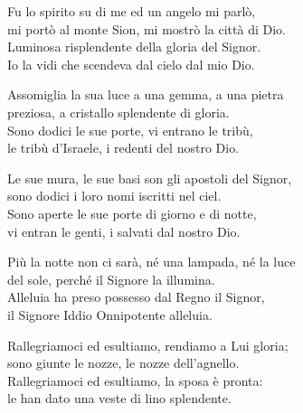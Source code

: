 

\spazio

\strofa Fu lo spirito su di me ed un angelo mi parlò,\\
mi portò al monte Sion, mi mostrò la città di Dio.\\
Luminosa risplendente della gloria del Signor.\\
Io la vidi che scendeva dal cielo dal mio Dio.

\spazio


\spazio

\strofa Assomiglia la sua luce a una gemma, a una pietra\\
preziosa, a cristallo splendente di gloria.\\
Sono dodici le sue porte, vi entrano le tribù,\\
le tribù d'Israele, i redenti del nostro Dio.

\spazio


\spazio

\strofa Le sue mura, le sue basi son gli apostoli del Signor,\\
sono dodici i loro nomi iscritti nel ciel.\\
Sono aperte le sue porte di giorno e di notte,\\
vi entran le genti, i salvati dal nostro Dio.

\spazio


\spazio

\strofa Più la notte non ci sarà, né una lampada, né la luce\\
del sole, perché il Signore la illumina.\\
Alleluia ha preso possesso dal Regno il Signor,\\
il Signore Iddio Onnipotente alleluia.

\spazio


\spazio

\strofa Rallegriamoci ed esultiamo, rendiamo a Lui gloria;\\
sono giunte le nozze, le nozze dell'agnello.\\
Rallegriamoci ed esultiamo, la sposa è pronta:\\
le han dato una veste di lino splendente.

